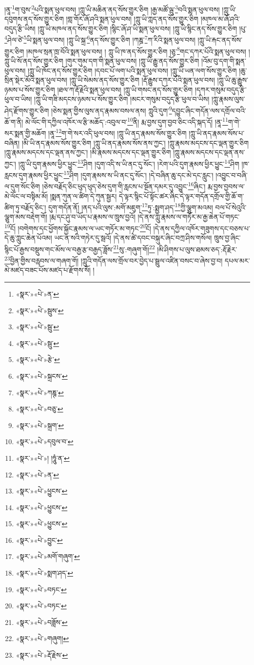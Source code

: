 །ནཱ་\footnote{«སྣར་»«པེ་»ན་}ག་བུས་\footnote{«སྣར་»«པེ་»སྦུས་}པའི་སྨན་ཕུལ་བས། །ཀླུ་ཡི་མཆིན་ནད་སོས་གྱུར་ཅིག །རྒྱ་མཚོ་ལྦུ་\footnote{«སྣར་»«པེ་»སྦུ་}བའི་སྨན་ཕུལ་བས། །ཀླུ་ཡི་དབུགས་ནད་སོས་གྱུར་ཅིག །གླ་གོར་ཞོ་ཤའི་སྨན་ཕུལ་བས། །ཀླུ་ཡི་ཀླད་ནད་སོས་གྱུར་ཅིག །མཁལ་མ་ཞོ་ཤའི་བདུད་རྩི་ཡིས། །ཀླུ་ཡི་མཁལ་ནད་སོས་གྱུར་ཅིག །སྙིང་ཞོ་ཤ་ཡི་སྨན་ཕུལ་བས། །ཀླུ་ཡི་སྙིང་ནད་སོས་གྱུར་ཅིག །པུ་\footnote{«སྣར་»«པེ་»སྦུ་}ཤེལ་ཙེ་\footnote{«སྣར་»«པེ་»རྩེ་}ཡི་སྨན་ཕུལ་བས། །ཀླུ་ཡི་སྐྲ་\footnote{«སྣར་»«པེ་»སྐྲངས་}ནད་སོས་གྱུར་ཅིག །ཀཎྜ་\footnote{«སྣར་»«པེ་»ཀཎྚ་}ཀ་རིའི་སྨན་ཕུལ་བས། །ཀླུ་ཡི་རྐང་ནད་སོས་གྱུར་ཅིག །མཁལ་སྲན་ཁྲ་བོའི་སྨན་ཕུལ་བས། །
ཀླུ་ཡི་ཁ་ནད་སོས་གྱུར་ཅིག །ཅུ་\footnote{«སྣར་»«པེ་»བཅུ་}གང་དཀར་པོའི་སྨན་ཕུལ་བས། །ཀླུ་ཡི་སོ་ནད་སོས་གྱུར་ཅིག །གུར་གུམ་དག་གི་སྨན་ཕུལ་བས། །ཀླུ་ཡི་རྒྱུ་ནད་སོས་གྱུར་ཅིག །འོམ་བུ་དག་གི་སྨན་ཕུལ་བས། །ཀླུ་ཡི་ཁོང་ནད་སོས་གྱུར་ཅིག །དབང་པོ་ལག་པའི་སྨན་ཕུལ་བས། །ཀླུ་ཡི་ཡན་ལག་སོས་གྱུར་ཅིག །ཆུ་སྲིན་སྡེར་མོའི་སྨན་ཕུལ་བས། །ཀླུ་ཡི་སེམས་ནད་སོས་གྱུར་ཅིག །རྡོ་རྒྱུས་དཀར་པོའི་སྨན་ཕུལ་བས། །ཀླུ་ཡི་ཆུ་རྒྱུས་ཉམས་པ་སོས་གྱུར་ཅིག །ཐལ་ཀ་རྡོ་རྗེའི་སྨན་ཕུལ་བས། །ཀླུ་ཡི་གསང་ནད་སོས་གྱུར་ཅིག །དཀར་གསུམ་བདུད་རྩི་ཕུལ་བ་ཡིས། །ཀླུ་ཡི་གཟི་མདངས་ཉམས་པ་སོས་གྱུར་ཅིག །མངར་གསུམ་བདུད་རྩི་ཕུལ་བ་ཡིས། །ཀླུ་རྣམས་ལུས་ཤེད་རྫོགས་གྱུར་ཅིག །ཅེས་སྨན་གྱིས་ལུས་ནད་རྣམས་བསལ་ནས། ཀླུའི་དུག་\footnote{«སྣར་»«པེ་»སྐྲག་}དབྱུང་ཞིང་གདོན་ལས་དགྲོལ་བའི་ཆོ་ག་ནི། མེ་ལོང་གི་དཀྱིལ་འཁོར་ལ་རྩི་མཆོད་:འབུལ་བ་\footnote{«སྣར་»«པེ་»དབུལ་བ་}ནི། རྨ་བྱས་དུག་བྱབ་ཅིང་འདི་སྐད་དོ། །ནཱ་\footnote{«སྣར་»«པེ་»། །ཧཱུཾ་ན་}ག་གེ་སར་སྨན་གྱི་མཆོག །ནཱ་\footnote{«སྣར་»«པེ་»ན་}ག་གེ་སར་འདི་ཕུལ་བས། །ཀླུ་ཡི་ནད་རྣམས་སོས་གྱུར་ཅིག །ཀླུ་ཡི་ནད་རྣམས་སོས་པ་བཞིན། །མི་ཡི་ནད་རྣམས་སོས་གྱུར་ཅིག །ཀླུ་ཡི་ནད་རྣམས་སོས་ནས་ཀྱང་། །ཀླུ་རྣམས་མདངས་དང་ལྡན་གྱུར་ཅིག །ཀླུ་རྣམས་མདངས་དང་ལྡན་ནས་ཀྱང་། །མི་རྣམས་མདངས་དང་ལྡན་གྱུར་ཅིག །ཀླུ་རྣམས་མདངས་དང་ལྡན་ནས་ཀྱང་། །ཀླུ་ཡི་དུག་རྣམས་ཕྱིར་ཕྱུང་\footnote{«སྣར་»«པེ་»ཕྱུངས་}ཤིག །དུག་འདི་ས་ཡི་ནང་དུ་སོང་། །རེག་པའི་དུག་རྣམས་ཕྱིར་ཕྱུང་\footnote{«སྣར་»«པེ་»ཕྱུངས་}ཤིག །ཁ་རླངས་དུག་རྣམས་ཕྱིར་ཕྱུང་\footnote{«སྣར་»«པེ་»ཕྱུངས་}ཤིག །དུག་རྣམས་ས་ཡི་ནང་དུ་སོང་། །དེ་བཞིན་ཆུ་དང་མེ་དང་རླུང་། །འབྱུང་བ་བཞི་ལ་དུག་སོང་ཅིག །ཅེས་བརྗོད་ཅིང་ཕུད་ཕུད་ཅེས་དུག་གི་རླངས་པ་སྔོན་དམར་དུ་འབྱུང་\footnote{«སྣར་»«པེ་»བྱུང་}ཞིང་། རྨ་བྱས་བྱབས་ལ་མེ་ལོང་ལ་བསྟིམ་མོ། །སྨན་ཀུན་ལ་ཚིག་དེ་ཀུན་སྦྱར། དེ་ལྟར་སྙིང་པོ་སྟོང་ཚར་ཞིང་དེ་ལྟར་གདོན་དགྲོལ་གྱི་ཆོ་ག་ཚིག་ཏུ་བརྗོད་ཅིང་། དུག་གདོན་ནོ། །ནད་པའི་ལུས་:མགོ་མཇུག་\footnote{«སྣར་»«པེ་»མགོ་གཞུག་}ཏུ་:སྨྱག་ཤད་\footnote{«སྣར་»«པེ་»སྨག་ཤད་}ཀྱི་ལྕུག་མའམ། བལ་པོ་སེའུའི་ལྕུག་མས་བརྡེག་གོ། །རྨ་དང་ཤུ་བ་ཡོད་པ་རྣམས་ལ་ཁྲུས་བྱའོ། །དེ་ནས་ཀླུ་རྣམས་ལ་གཏོར་མ་རྒྱ་ཆེན་པོ་གཏང་\footnote{«སྣར་»«པེ་»བཏང་}ངོ། །བགེགས་དང་ཕྱོགས་སྐྱོང་རྣམས་ལ་ཡང་གཏོར་མ་གཏང་\footnote{«སྣར་»«པེ་»བཏང་}ངོ། །དེ་ནས་དཀྱིལ་འཁོར་གཟུགས་དང་བཅས་པ་དེ་ཆུ་ཀླུང་ཆེན་པོའམ། ཡང་ན་སའི་གཏེར་དུ་སྦའོ། །དེ་ནས་ཚེ་དབང་བསྐུར་ཞིང་བཀྲ་ཤིས་གསོལ། ཁྲུས་བྱ་ཞིང་སྙིང་པོ་རྒྱས་བསྡུས་གང་མོས་ལ་བརྒྱ་རྩ་བརྒྱད་ཟློས་\footnote{«སྣར་»«པེ་»བཟློས་}སུ་:གཞུག་གོ།\footnote{«སྣར་»«པེ་»གཞུག།} །མི་ཤིགས་པ་ལུས་ཐམས་ཅད་:རྡོ་རྗེར་\footnote{«སྣར་»«པེ་»རྡོ་རྗེས་}བྱིན་གྱིས་བརླབས་ལ་གཞག་གོ། །ཀླུའི་གདོན་ལས་གྲོལ་བར་བྱེད་པ་སྦྲུལ་འཛིན་བསང་བ་ཞེས་བྱ་བ། དཔལ་མར་མེ་མཛད་བཟང་པོས་མཛད་པ་རྫོགས་སོ། ། 